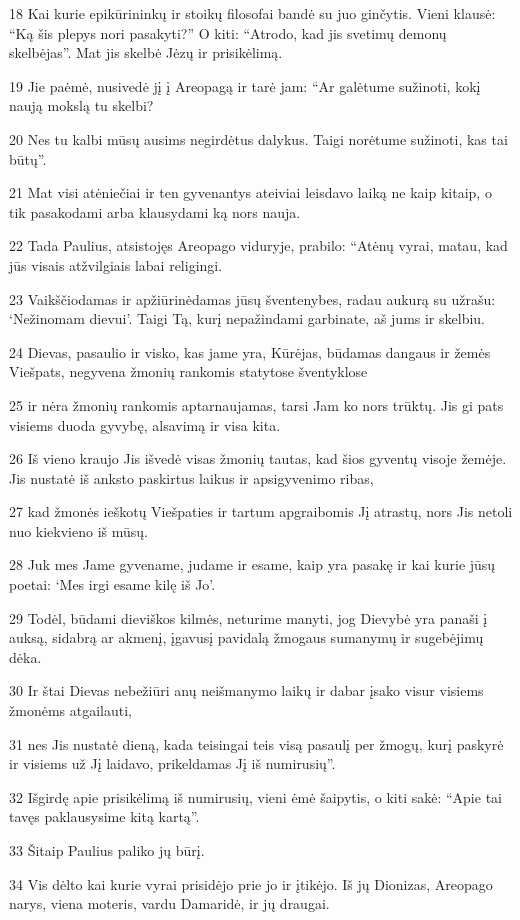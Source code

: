 \par 18 Kai kurie epikūrininkų ir stoikų filosofai bandė su juo ginčytis. Vieni klausė: “Ką šis plepys nori pasakyti?” O kiti: “Atrodo, kad jis svetimų demonų skelbėjas”. Mat jis skelbė Jėzų ir prisikėlimą. 
\par 19 Jie paėmė, nusivedė jį į Areopagą ir tarė jam: “Ar galėtume sužinoti, kokį naują mokslą tu skelbi? 
\par 20 Nes tu kalbi mūsų ausims negirdėtus dalykus. Taigi norėtume sužinoti, kas tai būtų”. 
\par 21 Mat visi atėniečiai ir ten gyvenantys ateiviai leisdavo laiką ne kaip kitaip, o tik pasakodami arba klausydami ką nors nauja. 
\par 22 Tada Paulius, atsistojęs Areopago viduryje, prabilo: “Atėnų vyrai, matau, kad jūs visais atžvilgiais labai religingi. 
\par 23 Vaikščiodamas ir apžiūrinėdamas jūsų šventenybes, radau aukurą su užrašu: ‘Nežinomam dievui’. Taigi Tą, kurį nepažindami garbinate, aš jums ir skelbiu. 
\par 24 Dievas, pasaulio ir visko, kas jame yra, Kūrėjas, būdamas dangaus ir žemės Viešpats, negyvena žmonių rankomis statytose šventyklose 
\par 25 ir nėra žmonių rankomis aptarnaujamas, tarsi Jam ko nors trūktų. Jis gi pats visiems duoda gyvybę, alsavimą ir visa kita. 
\par 26 Iš vieno kraujo Jis išvedė visas žmonių tautas, kad šios gyventų visoje žemėje. Jis nustatė iš anksto paskirtus laikus ir apsigyvenimo ribas, 
\par 27 kad žmonės ieškotų Viešpaties ir tartum apgraibomis Jį atrastų, nors Jis netoli nuo kiekvieno iš mūsų. 
\par 28 Juk mes Jame gyvename, judame ir esame, kaip yra pasakę ir kai kurie jūsų poetai: ‘Mes irgi esame kilę iš Jo’. 
\par 29 Todėl, būdami dieviškos kilmės, neturime manyti, jog Dievybė yra panaši į auksą, sidabrą ar akmenį, įgavusį pavidalą žmogaus sumanymų ir sugebėjimų dėka. 
\par 30 Ir štai Dievas nebežiūri anų neišmanymo laikų ir dabar įsako visur visiems žmonėms atgailauti, 
\par 31 nes Jis nustatė dieną, kada teisingai teis visą pasaulį per žmogų, kurį paskyrė ir visiems už Jį laidavo, prikeldamas Jį iš numirusių”. 
\par 32 Išgirdę apie prisikėlimą iš numirusių, vieni ėmė šaipytis, o kiti sakė: “Apie tai tavęs paklausysime kitą kartą”. 
\par 33 Šitaip Paulius paliko jų būrį. 
\par 34 Vis dėlto kai kurie vyrai prisidėjo prie jo ir įtikėjo. Iš jų Dionizas, Areopago narys, viena moteris, vardu Damaridė, ir jų draugai.


